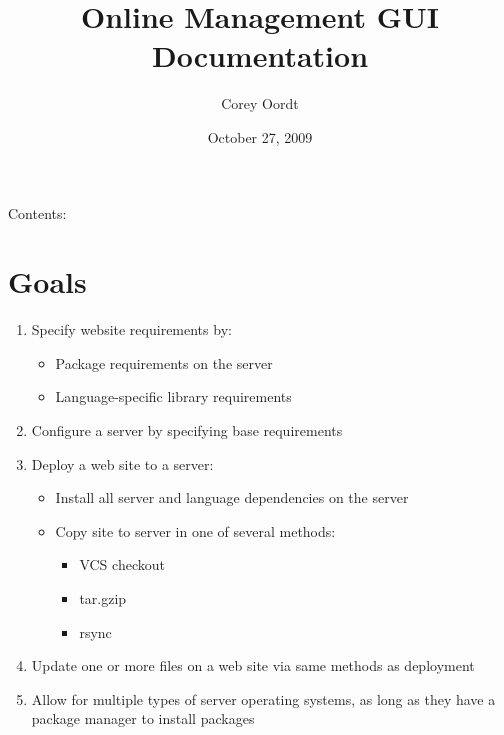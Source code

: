 \documentclass[letterpaper,10pt,english]{manual}
\title{Online Management GUI Documentation}
\date{October 27, 2009}
\author{Corey Oordt}
\begin{document}
\maketitle
\tableofcontents
\hypertarget{--doc-index}{}


Contents:

\resetcurrentobjects
\hypertarget{--doc-goals}{}

\chapter{Goals}
\begin{enumerate}
\item {} 
Specify website requirements by:
\begin{itemize}
\item {} 
Package requirements on the server

\item {} 
Language-specific library requirements

\end{itemize}

\item {} 
Configure a server by specifying base requirements

\item {} 
Deploy a web site to a server:
\begin{itemize}
\item {} 
Install all server and language dependencies on the server

\item {} 
Copy site to server in one of several methods:
\begin{itemize}
\item {} 
VCS checkout

\item {} 
tar.gzip

\item {} 
rsync

\end{itemize}

\end{itemize}

\item {} 
Update one or more files on a web site via same methods as deployment

\item {} 
Allow for multiple types of server operating systems, as long as they have a package manager to install packages

\end{enumerate}
\end{document}
